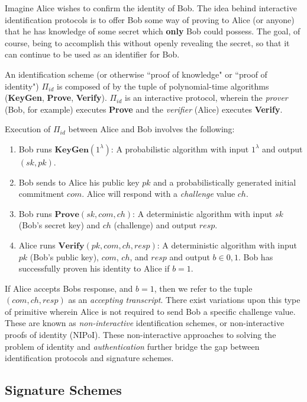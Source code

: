 Imagine Alice wishes to confirm the identity of Bob. The idea behind interactive identification protocols is to offer Bob some way of proving to Alice (or anyone) that he has knowledge of some secret which \textbf{only} Bob could possess. The goal, of course, being to accomplish this without openly revealing the secret, so that it can continue to be used as an identifier for Bob. 

An identification scheme (or otherwise ``proof of knowledge" or ``proof of identity") $\Pi_{id}$ is composed of by the tuple of polynomial-time algorithms (\textbf{KeyGen}, \textbf{Prove}, \textbf{Verify}). $\Pi_{id}$ is an interactive protocol, wherein the \emph{prover} (Bob, for example) 
executes \textbf{Prove} and the \emph{verifier} (Alice) executes \textbf{Verify}.

Execution of $\Pi_{id}$ between Alice and Bob involves the following:
\begin{enumerate}[label=(\roman*)]
\item Bob runs $\textbf{KeyGen}(1^\lambda)$: A probabilistic algorithm with input $1^\lambda$ and output $(sk,pk)$. 
\item Bob sends to Alice his public key $pk$ and a probabilistically generated initial commitment $com$. Alice will respond with a \emph{challenge} value $ch$.
\item Bob runs $\textbf{Prove}(sk, com, ch)$: A deterministic algorithm with input $sk$ (Bob's secret key) and $ch$ (challenge) and output $resp$.
\item Alice runs $\textbf{Verify}(pk, com, ch, resp)$: A deterministic algorithm with input $pk$ (Bob's public key), $com$, $ch$, and $resp$ and output $b \in {0,1}$. Bob has successfully proven his identity to Alice if $b = 1$.
\end{enumerate}

If Alice accepts Bobs response, and $b = 1$, then we refer to the tuple $(com,ch,resp)$ as an \emph{accepting transcript}.
There exist variations upon this type of primitive wherein Alice is not required to send Bob a specific challenge value. These are known as \emph{non-interactive} identification schemes, or non-interactive proofs of identity (NIPoI). These non-interactive approaches to solving the problem of identity and \emph{authentication} further bridge the gap between identification protocols and signature schemes. 

\subsection{Signature Schemes}


